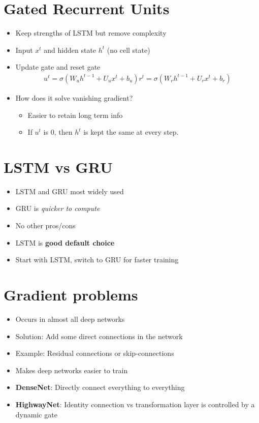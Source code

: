 \documentclass[a4paper]{article}
\begin{document}
\section{Gated Recurrent Units}
\begin{itemize}
    \item Keep strengths of LSTM but remove complexity
    \item Input $x^t$ and hidden state $h^t$ (no cell state)
    \item Update gate and reset gate
    \begin{equation}
    \begin{split}
        u^t = \sigma(W_uh^{t-1} + U_ux^t + b_u)
        r^t = \sigma(W_rh^{t-1} + U_rx^t + b_r)
    \end{split}
    \end{equation}
    \item How does it solve vanishing gradient?
    \begin{itemize}
        \item Easier to retain long term info
        \item If $u^t$ is 0, then $h^t$ is kept the same at every step.
    \end{itemize}
\end{itemize}
\section{LSTM vs GRU}
\begin{itemize}
    \item LSTM and GRU most widely used
    \item GRU is \textit{quicker to compute} 
    \item No other pros/cons
    \item LSTM is \textbf{good default choice }  
    \item Start with LSTM, switch to GRU for faster training
\end{itemize}
\section{Gradient problems}
\begin{itemize}
    \item Occurs in almost all deep networks
    \item Solution: Add some direct connections in the network
    \item Example: Residual connections or skip-connections
    \item Makes deep networks easier to train
    \item \textbf{DenseNet}: Directly connect everything to everything 
    \item \textbf{HighwayNet}: Identity connection vs transformation layer is controlled by a dynamic gate
\end{itemize}
\end{document}
